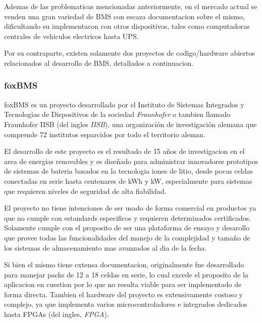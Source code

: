 \documentclass[10pt,a4paper]{article}
\begin{document}
    \noindent Ademas de las problematicas mencionadas anteriormente, en el 
    mercado actual se venden una gran variedad de \acrshort{BMS} con escaza documentacion  
    sobre el mismo, dificultando su implementacon con otros dispositivos, tales
    como computadoras centrales de vehiculos electricos hasta \acrshort{UPS}.
   
    \noindent Por su contraparte, existen solamente dos proyectos de 
    codigo/hardware abiertos relacionados al desarrollo de \acrshort{BMS}, detallados a
    continuacion.

    \subsubsection{foxBMS}

    \noindent foxBMS es un proyecto desarrollado por el Instituto de Sistemas 
    Integrados y Tecnologias de Dispositivos de la sociedad \emph{Fraunhofer} o 
    tambien llamado Fraunhofer IISB (del ingles \emph{\acrfull{IISB}}), una organización de investigación 
    alemana que comprende 72 institutos esparcidos por todo el territorio
    aleman.
    
    \noindent El desarrollo de este proyecto es el resultado de 15 años de 
    investigacion en el area de energias renovables y es diseñado para 
    administrar innovadores prototipos de sistemas de bateria basados en la 
    tecnologia iones de litio, desde pocas celdas conectadas en serie hasta 
    centenares de kWh y kW, especialmente para sistemas que requieren niveles 
    de seguridad de alta fiabilidad.
    
    \noindent El proyecto no tiene intenciones de ser usado de forma comercial 
    en productos ya que no cumple con estandards especificos y requieren
    determinados certificados. Solamente cumple con el proposito de ser una
    plataforma de ensayo y desarollo que provee todas las funcionalidades del
    manejo de la complejidad y tamaño de los sistemas de almacenamiento mas
    avanzados al dia de la fecha.
    
    \noindent Si bien el mismo tiene extensa documentacion, originalmente fue
    desarrollado para manejar packs de 12 a 18 celdas en serie, lo cual excede
    el proposito de la aplicacion en cuestion por lo que no resulta viable para
    ser implementado de forma directa. Tambien el hardware del proyecto es
    extensivamente costoso y complejo, ya que implementa varios 
    microcontroladores e integrados dedicados hasta \acrshort{FPGA}s 
    (del ingles, \emph{\acrlong{FPGA}}).
\end{document}
